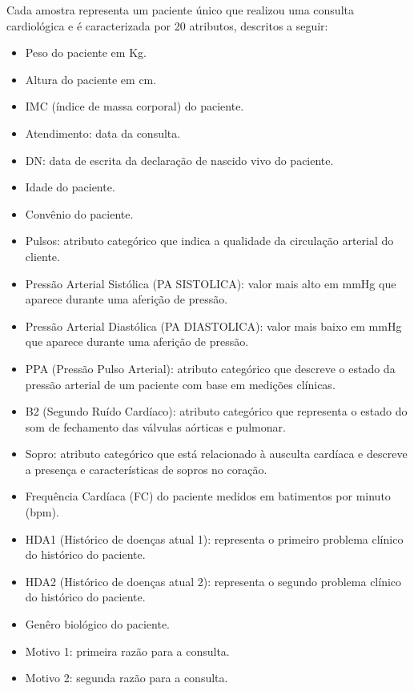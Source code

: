 \documentclass[10pt, conference, compsocconf]{IEEEtran}
\begin{document}
Cada amostra representa um paciente único que realizou uma consulta cardiológica e é caracterizada por 20 atributos, 
descritos a seguir:
\begin{itemize}
  \item Peso do paciente em Kg.
  \item Altura do paciente em cm.
  \item IMC (índice de massa corporal) do paciente.
  \item Atendimento: data da consulta.
  \item DN: data de escrita da declaração de nascido vivo do paciente.
  \item Idade do paciente.
  \item Convênio do paciente.
  \item Pulsos: atributo categórico que indica a qualidade da circulação arterial do cliente.
  \item Pressão Arterial Sistólica (PA SISTOLICA): valor mais alto em mmHg que aparece durante uma aferição de pressão.
  \item Pressão Arterial Diastólica (PA DIASTOLICA): valor mais baixo em mmHg que aparece durante uma aferição de pressão.
  \item PPA (Pressão Pulso Arterial): atributo categórico que descreve o estado da pressão arterial de um paciente com base em medições clínicas.
  \item B2 (Segundo Ruído Cardíaco): atributo categórico que representa o estado do som de fechamento das válvulas aórticas e pulmonar.
  \item Sopro: atributo categórico que está relacionado à ausculta cardíaca e descreve a presença e características de sopros no coração.
  \item Frequência Cardíaca (FC) do paciente medidos em batimentos por minuto (bpm).
  \item HDA1 (Histórico de doenças atual 1): representa o  primeiro problema clínico do histórico do paciente.
  \item HDA2 (Histórico de doenças atual 2): representa o segundo problema clínico do histórico do paciente. 
  \item Genêro biológico do paciente.
  \item Motivo 1: primeira razão para a consulta.
  \item Motivo 2: segunda razão para a consulta.
\end{itemize}

\vspace{0.3cm}
\end{document}
